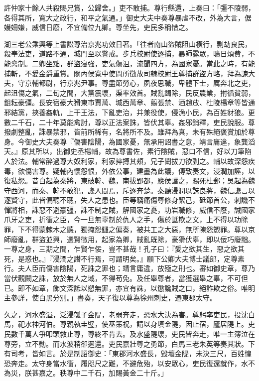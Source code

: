 \begin{pinyinscope}
許仲家十餘人共殺賜兄賞，公歸舍。」吏不敢捕。尊行縣還，上奏曰：「彊不陵弱，各得其所，寬大之政行，和平之氣通。」御史大夫中奏尊暴虐不改，外為大言，倨嫚姍嫌，威信日廢，不宜備位九卿。尊坐先，吏民多稱惜之。

湖三老公乘興等上書訟尊治京兆功效日著。「往者南山盜賊阻山橫行，剽劫良民，殺奉法吏，道路不通，城門至以警戒。步兵校尉使逐捕，暴師露眾，曠日煩費，不能禽制。二卿坐黜，群盜寖強，吏氣傷沮，流聞四方，為國家憂。當此之時，有能捕斬，不愛金爵重賞。關內侯寬中使問所徵故司隸校尉王尊捕群盜方略，拜為諫大夫，守京輔都尉，行京兆尹事。尊盡節勞心，夙夜思職，卑體下士，厲奔北之吏，起沮傷之氣，二旬之間，大黨震壞，渠率效首。賊亂蠲除，民反農業，拊循貧弱，鉏耘豪彊。長安宿豪大猾東市賈萬、城西萬章、翦張禁、酒趙放、杜陵楊章等皆通邪結黨，挾養姦軌，上干王法，下亂吏治，并兼役使，侵漁小民，為百姓豺狼。更數二千石，二十年莫能禽討，尊以正法案誅，皆伏其辜。姦邪銷釋，吏民說服。尊撥劇整亂，誅暴禁邪，皆前所稀有，名將所不及。雖拜為真，未有殊絕褒賞加於尊身。今御史大夫奏尊『傷害陰陽，為國家憂，無承用詔書之意，靖言庸違，象龔滔天。』原其所以，出御史丞楊輔，故為尊書佐，素行陰賊，惡口不信，好以刀筆陷人於法。輔常醉過尊大奴利家，利家捽搏其頰，兄子閎拔刀欲剄之。輔以故深怨疾毒，欲傷害尊。疑輔內懷怨恨，外依公事，建畫為此議，傅致奏文，浸潤加誣，以復私怨。昔白起為秦將，東破韓、魏，南拔郢都，應侯譖之，賜死杜郵；吳起為魏守西河，而秦、韓不敢犯，讒人間焉，斥逐奔楚。秦聽浸潤以誅良將，魏信讒言以逐賢守，此皆偏聽不聰，失人之患也。臣等竊痛傷尊修身絜己，砥節首公，刺譏不憚將相，誅惡不避豪彊，誅不制之賊，解國家之憂，功岩職修，威信不廢，誠國家爪牙之吏，折衝之臣，今一旦無辜制於仇人之手，傷於詆欺之文，上不得以功除罪，下不得蒙棘木之聽，獨掩怨讎之偏奏，被共工之大惡，無所陳怨愬罪。尊以京師廢亂，群盜並興，選賢徵用，起家為卿，賊亂既除，豪猾伏辜，即以佞巧廢黜。一尊之身，三期之間，乍賢乍佞，豈不甚哉！孔子曰：『愛之欲其生，惡之欲其死，是惑也。』『浸潤之譖不行焉，可謂明矣。』願下公卿大夫博士議郎，定尊素行。夫人臣而傷害陰陽，死誅之罪也；靖言庸違，放殛之刑也。審如御史章，尊乃當伏觀闕之誅，放於無人之域，不得苟免。及任舉尊者，當獲選舉之辜，不可但已。即不如章，飾文深詆以愬無罪，亦宜有誅，以懲讒賊之口，絕詐欺之俗。唯明主參詳，使白黑分別。」書奏，天子復以尊為徐州刺史，遷東郡太守。

久之，河水盛溢，泛浸瓠子金隄，老弱奔走，恐水大決為害。尊躬率吏民，投沈白馬，祀水神河伯。尊親執圭璧，使巫策祝，請以身填金隄，因止宿，廬居隄上。吏民數千萬人爭叩頭救止尊，尊終不肯去。及水盛隄壞，吏民皆奔走，唯一主簿泣在尊旁，立不動。而水波稍卻迴還。吏民嘉壯尊之勇節，白馬三老朱英等奏其狀。下有司考，皆如言。於是制詔御史：「東郡河水盛長，毀壞金隄，未決三尺，百姓惶恐奔走。太守身當水衝，履咫尺之難，不避危殆，以安眾心，吏民復還就作，水不為災，朕甚嘉之。秩尊中二千石，加賜黃金二十斤。」


\end{pinyinscope}
